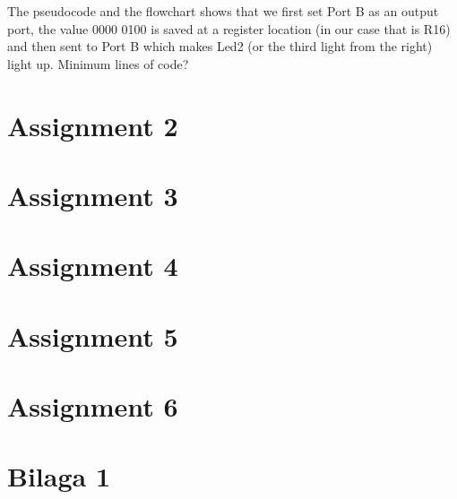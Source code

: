 \documentclass[a4paper, 12pt]{article}
\begin{document}
The pseudocode and the flowchart shows that we first set Port B as an output port, the value 0000 0100 is saved at a register location (in our case that is R16) and then sent to Port B which makes Led2 (or the third light from the right) light up. 
Minimum lines of code?



\newpage

\section{Assignment 2}

\newpage

\section{Assignment 3}

\newpage

\section{Assignment 4}

\newpage

\section{Assignment 5}

\newpage

\section{Assignment 6}

\newpage


\setcounter{page}{1} 
\appendix
\section{Bilaga 1} 
\end{document}
